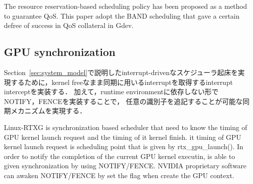 The resource reservation-based scheduling policy has been proposed\cite{gdev,cbs,tbs} as a method to guarantee QoS.
This paper adopt the BAND scheduling that gave a certain defree of success in QoS collateral in Gdev.

\fi
\subsection{GPU synchronization}
Section~\ref{sec:system_model}で説明したinterrupt-drivenなスケジューラ起床を実現するために，kernel freeなまま同期に用いるinterruptを取得するinterrupt interceptを実装する．
加えて，runtime environmentに依存しない形でNOTIFY，FENCEを実装することで，
任意の識別子を追記することが可能な同期メカニズムを実現する．


Linux-RTXG is synchronization based scheduler that need to know the timing of GPU kernel launch request and the timing of it kernel finish.
it timing of GPU kernel launch request is scheduling point that is given by rtx\_gpu\_launch().
In order to notify the completion of the current GPU kernel executin, is able to given synchronization by using NOTIFY/FENCE.
NVIDIA proprietary software can awaken NOTIFY/FENCE by set the flag when create the GPU context.
\fi
